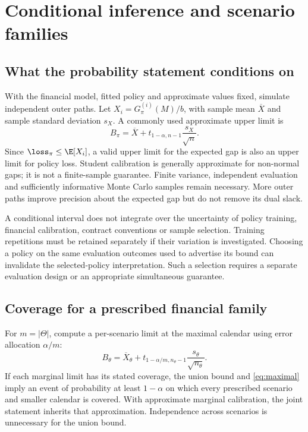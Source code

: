 \section{Conditional inference and scenario families}

\subsection{What the probability statement conditions on}

With the financial model, fitted policy and approximate values fixed, simulate independent outer paths. Let $X_i=G_\pi^{(i)}(M)/b$, with sample mean $\overline X$ and sample standard deviation $s_X$. A commonly used approximate upper limit is
\begin{equation}
 B_\pi=\overline X+t_{1-\alpha,n-1}\frac{s_X}{\sqrt n}.
\label{eq:pointwise}
\end{equation}
Since $\loss_\pi\leq\E[X_i]$, a valid upper limit for the expected gap is also an upper limit for policy loss. Student calibration is generally approximate for non-normal gaps; it is not a finite-sample guarantee. Finite variance, independent evaluation and sufficiently informative Monte Carlo samples remain necessary. More outer paths improve precision about the expected gap but do not remove its dual slack.

A conditional interval does not integrate over the uncertainty of policy training, financial calibration, contract conventions or sample selection. Training repetitions must be retained separately if their variation is investigated. Choosing a policy on the same evaluation outcomes used to advertise its bound can invalidate the selected-policy interpretation. Such a selection requires a separate evaluation design or an appropriate simultaneous guarantee.

\subsection{Coverage for a prescribed financial family}

For $m=|\Theta|$, compute a per-scenario limit at the maximal calendar using error allocation $\alpha/m$:
\begin{equation}
 B_\theta=\overline X_\theta+
 t_{1-\alpha/m,n_\theta-1}\frac{s_\theta}{\sqrt{n_\theta}}.
\label{eq:family}
\end{equation}
If each marginal limit has its stated coverage, the union bound and \eqref{eq:maximal} imply an event of probability at least $1-\alpha$ on which every prescribed scenario and smaller calendar is covered. With approximate marginal calibration, the joint statement inherits that approximation. Independence across scenarios is unnecessary for the union bound.

